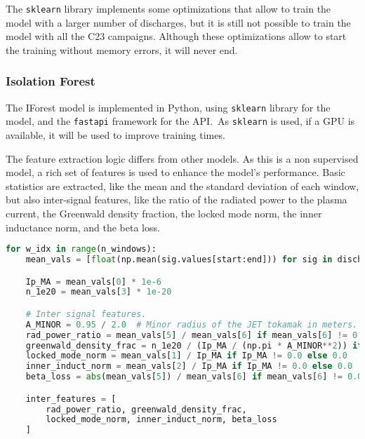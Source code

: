The \texttt{sklearn} library implements some optimizations that allow to train the model with a larger number of discharges, but it is still not possible to train the model with all the C23 campaigns. Although these optimizations allow to start the training without memory errors, it will never end.

\subsubsection{Isolation Forest}\label{sec:iforest-implementation}

The \ac{IForest} model is implemented in Python, using \texttt{sklearn} library for the model, and the \texttt{fastapi} framework for the API.\ As \texttt{sklearn} is used, if a \ac{GPU} is available, it will be used to improve training times.

The feature extraction logic differs from other models. As this is a non supervised model, a rich set of features is used to enhance the model's performance. Basic statistics are extracted, like the mean and the standard deviation of each window, but also inter-signal features, like the ratio of the radiated power to the plasma current, the Greenwald density fraction, the locked mode norm, the inner inductance norm, and the beta loss.

\begin{lstlisting}[language=Python, caption={Inter-signal features extraction}, label={lst:inter-signal-features}]
for w_idx in range(n_windows):
    mean_vals = [float(np.mean(sig.values[start:end])) for sig in discharge.signals]

    Ip_MA = mean_vals[0] * 1e-6
    n_1e20 = mean_vals[3] * 1e-20

    # Inter signal features.
    A_MINOR = 0.95 / 2.0  # Minor radius of the JET tokamak in meters. Used in the Greenwald limit.
    rad_power_ratio = mean_vals[5] / mean_vals[6] if mean_vals[6] != 0.0 else 0.0
    greenwald_density_frac = n_1e20 / (Ip_MA / (np.pi * A_MINOR**2)) if Ip_MA != 0.0 else 0.0
    locked_mode_norm = mean_vals[1] / Ip_MA if Ip_MA != 0.0 else 0.0
    inner_induct_norm = mean_vals[2] / Ip_MA if Ip_MA != 0.0 else 0.0
    beta_loss = abs(mean_vals[5]) / mean_vals[6] if mean_vals[6] != 0.0 else 0.0

    inter_features = [
        rad_power_ratio, greenwald_density_frac,
        locked_mode_norm, inner_induct_norm, beta_loss
    ]
\end{lstlisting}


